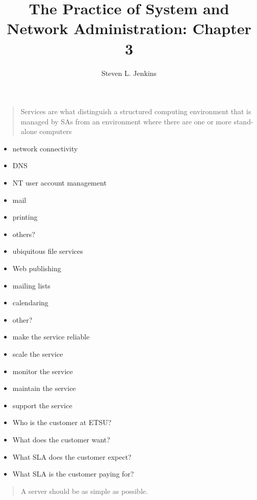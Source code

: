 \documentclass{slides}
\title{The Practice of System and Network Administration: Chapter 3}
\author{Steven L. Jenkins}
\newcommand{\bi}{\begin{itemize}}
\newcommand{\ei}{\end{itemize}}
\begin{document}
\maketitle


\begin{quotation}
Services are what distinguish a structured computing environment that is 
managed by SAs from an environment where there are one or more stand-alone
computers
\end{quotation}


\bi
\item network connectivity
\item DNS
\item NT user account management
\item mail
\item printing
\item others?
\ei


\bi
\item ubiquitous file services
\item Web publishing
\item mailing lists
\item calendaring
\item other?
\ei


\bi
\item make the service reliable
\item scale the service
\item monitor the service
\item maintain the service
\item support the service
\ei


\bi
\item Who is the customer at ETSU?
\item What does the customer want?
\item What SLA does the customer expect?
\item What SLA is the customer paying for?
\ei


\begin{quotation}
A server should be as simple as possible.
\end{quotation}
\end{document}
